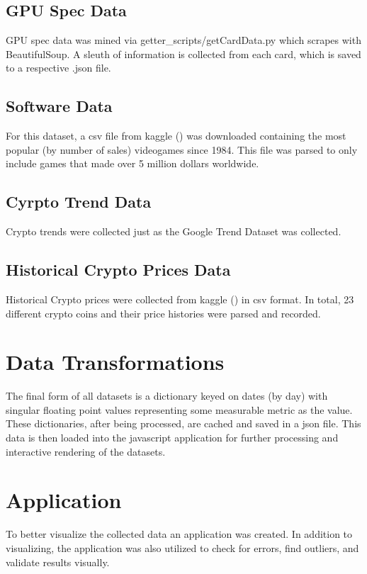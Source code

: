 \documentclass[twocolumn]{article}
\begin{document}
\subsection{GPU Spec Data}
GPU spec data was mined via getter\_scripts/getCardData.py which scrapes \cite{gpuSpecs} with BeautifulSoup. A sleuth of information is collected from each card, which is saved to a respective .json file.

\subsection{Software Data}
For this dataset, a csv file from kaggle (\cite{softwareData}) was downloaded containing the most popular (by number of sales) videogames since 1984. This file was parsed to only include games that made over 5 million dollars worldwide. 

\subsection{Cyrpto Trend Data}
Crypto trends were collected just as the Google Trend Dataset was collected. 

\subsection{Historical Crypto Prices Data}
Historical Crypto prices were collected from kaggle (\cite{cryptoHistory}) in csv format. In total, 23 different crypto coins and their price histories were parsed and recorded.

\section{Data Transformations}
The final form of all datasets is a dictionary keyed on dates (by day) with singular floating point values representing some measurable metric as the value. These dictionaries, after being processed, are cached and saved in a json file. This data is then loaded into the javascript application for further processing and interactive rendering of the datasets.

\section{Application}
To better visualize the collected data an application was created. In addition to visualizing, the application was also utilized to check for errors, find outliers, and validate results visually.
\end{document}
